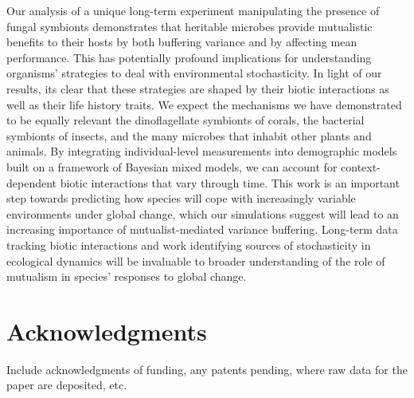 \documentclass[12pt]{article}
\begin{document}
Our analysis of a unique long-term experiment manipulating the presence of fungal symbionts demonstrates that heritable microbes provide mutualistic benefits to their hosts by both buffering variance and by affecting mean performance. 
This has potentially profound implications for understanding organisms' strategies to deal with environmental stochasticity.
In light of our results, its clear that these strategies are shaped by their biotic interactions as well as their life history traits.  
We expect the mechanisms we have demonstrated to be equally relevant the dinoflagellate symbionts of corals, the bacterial symbionts of insects, and the many microbes that inhabit other plants and animals.
By integrating individual-level measurements into demographic models built on a framework of Bayesian mixed models, we can account for context-dependent biotic interactions that vary through time.
This work is an important step towards predicting how species will cope with increasingly variable environments under global change, which our simulations suggest will lead to an increasing importance of mutualist-mediated variance buffering.
Long-term data tracking biotic interactions and work identifying sources of stochasticity in ecological dynamics will be invaluable to broader understanding of the role of mutualism in species' responses to global change. 















\section*{Acknowledgments}
Include acknowledgments of funding, any patents pending, where raw data for the paper are deposited, etc.

\end{document}
